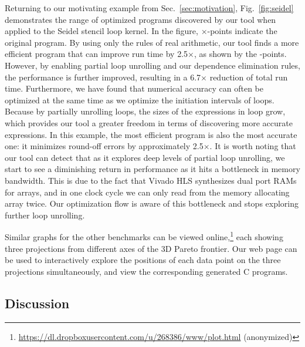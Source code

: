 Returning to our motivating example from Sec.~\ref{sec:motivation},
Fig.~\ref{fig:seidel} demonstrates the range of optimized programs discovered
by our tool when applied to the Seidel stencil loop kernel. In the figure,
$\times$-points indicate the original program. By using only the rules of
real arithmetic, our tool finds a more efficient program that can improve run
time by 2.5$\times$, as shown by the \redcircle-points. However, by enabling
partial loop unrolling and our dependence elimination rules, the performance
is further improved, resulting in a 6.7$\times$ reduction of total run time.
Furthermore, we have found that numerical accuracy can often be optimized at
the same time as we optimize the initiation intervals of loops. Because by
partially unrolling loops, the sizes of the expressions in loop grow, which
provides our tool a greater freedom in terms of discovering more accurate
expressions. In this example, the most efficient program is also the most
accurate one: it minimizes round-off errors by approximately 2.5$\times$. It
is worth noting that our tool can detect that as it explores deep levels of
partial loop unrolling, we start to see a diminishing return in performance as
it hits a bottleneck in memory bandwidth.  This is due to the fact that Vivado
HLS synthesizes dual port RAMs for arrays, and in one clock cycle we can only
read from the memory allocating array twice.  Our optimization flow is aware of
this bottleneck and stops exploring further loop unrolling.

Similar graphs for the other benchmarks can be viewed
online,\footnote{\url{https://dl.dropboxusercontent.com/u/268386/www/plot.html}
(anonymized)} each showing three projections from different axes of the
3D Pareto frontier. Our web page can be used to interactively explore the
positions of each data point on the three projections simultaneously, and view
the corresponding generated C programs.

\subsection{Discussion}
\label{sec:results_discussion}

